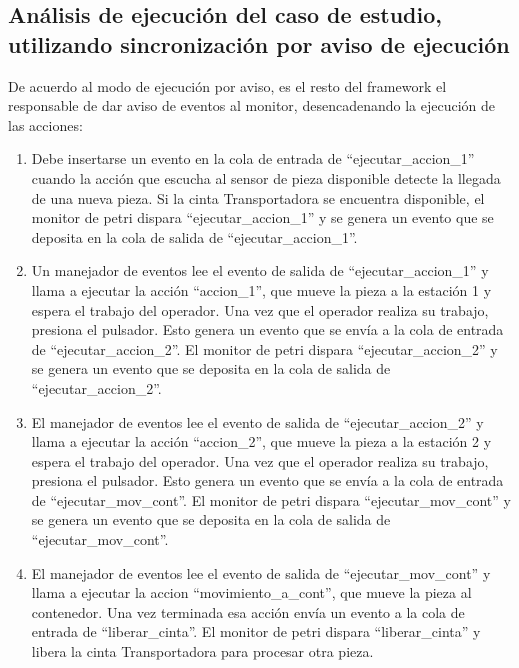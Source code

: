 \subsection{Análisis de ejecución del caso de estudio, utilizando
sincronización por aviso de ejecución} 
De acuerdo al modo de ejecución por aviso, es el resto del framework el
responsable de dar aviso de eventos al monitor, desencadenando la ejecución de las acciones:
\begin{enumerate}
    \item Debe insertarse un evento en la cola de entrada de
    ``ejecutar\_accion\_1'' cuando la acción que escucha al sensor de pieza
    disponible detecte la llegada de una nueva pieza.
    Si la cinta Transportadora se encuentra disponible, el monitor de petri dispara
    “ejecutar\_accion\_1” y se genera un evento que se deposita en la cola de
    salida de “ejecutar\_accion\_1”.
    \item Un manejador de eventos lee el evento de salida de
    “ejecutar\_accion\_1” y llama a ejecutar la acción “accion\_1”, que mueve
    la pieza a la estación 1 y espera el trabajo del operador. Una vez que el
    operador realiza su trabajo, presiona el pulsador. Esto genera un evento
    que se envía a la cola de entrada de “ejecutar\_accion\_2”. El monitor de
    petri dispara “ejecutar\_accion\_2” y se genera un evento que se deposita
    en la cola de salida de “ejecutar\_accion\_2”.
    \item El manejador de eventos
    lee el evento de salida de “ejecutar\_accion\_2” y llama a ejecutar la
    acción “accion\_2”, que mueve la pieza a la estación 2 y espera el trabajo
    del operador. Una vez que el operador realiza su trabajo, presiona el
    pulsador. Esto genera un evento que se envía a la cola de entrada de
    “ejecutar\_mov\_cont”. El monitor de petri dispara
    “ejecutar\_mov\_cont” y se genera un evento que se deposita en la cola de
    salida de “ejecutar\_mov\_cont”.
    \item El manejador de eventos lee el evento de salida de
    “ejecutar\_mov\_cont” y llama a ejecutar la accion “movimiento\_a\_cont”, que
    mueve la pieza al contenedor. Una vez terminada esa acción envía un evento
    a la cola de entrada de “liberar\_cinta”. El monitor de petri dispara
    “liberar\_cinta” y libera la cinta Transportadora para procesar otra pieza.
\end{enumerate}

